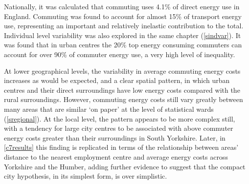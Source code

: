 \documentclass[a4paper, 11pt, twoside]{Thesis}
\begin{document}
Nationally, it was calculated that
commuting uses 4.1\% of direct energy use in England. Commuting was found to
account for almost 15\% of transport energy use, representing an
important and relatively inelastic contribution to the total.
Individual level variability was also explored in the
same chapter (\cref{sindvar}). It was found that in urban centres
the 20\% top energy consuming commuters can account for over 90\% of commuter
energy use, a very high level of inequality.

At lower geographical levels, the variability in average commuting energy
costs increases as would be expected, and a clear spatial pattern, in which
urban centres and their direct surroundings have low energy costs compared
with the rural surroundings. However, commuting energy costs still vary
greatly between many areas that are similar `on paper' at the level of
statistical wards (\cref{sregional}). At the local level, the pattern appears
to be more complex still, with a tendency for large city centres to be associated
with above commuter energy costs greater than their surroundings in South
Yorkshire. Later, in \cref{c7results} this finding is replicated in terms
of the relationship between areas' distance to the nearest employment
centre and average energy costs across Yorkshire and the Humber, adding
further evidence to suggest that the compact city hypothesis, in its simplest
form, is over simplistic. 
\end{document}

